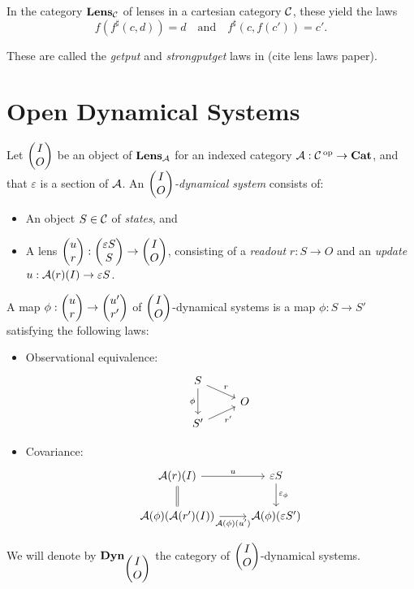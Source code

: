 In the category $\textbf{Lens}_{\operatorname{\mathcal{C}}}$ of lenses in a cartesian category $\operatorname{\mathcal{C}}$,
these yield the laws
$$f(f^{\sharp}(c, d)) = d \quad\text{and}\quad f^{\sharp}(c, f(c')) = c'.$$

These are called the \emph{getput} and \emph{strongputget} laws in (cite lens
laws paper).


\section{Open Dynamical Systems}

\begin{defn}
Let $\begin{pmatrix}{I} \\ {O} \end{pmatrix}$ be an object of $\textbf{Lens}_{\operatorname{\mathcal{A}}}$ for an indexed category
$\operatorname{\mathcal{A}} : \operatorname{\mathcal{C}}\operatorname{^\text{op}} \to \operatorname{\textbf{Cat}}$, and that $\varepsilon$ is a section of $\operatorname{\mathcal{A}}$. An
\emph{$\begin{pmatrix}{I} \\ {O} \end{pmatrix}$-dynamical system} consists of:
\begin{itemize}
\item An object $S \in \operatorname{\mathcal{C}}$ of \emph{states}, and
  \item A lens $\begin{pmatrix}{u} \\ {r} \end{pmatrix} : \begin{pmatrix}{\varepsilon S} \\ {S} \end{pmatrix} \to \begin{pmatrix}{I} \\ {O} \end{pmatrix}$,
    consisting of a \emph{readout} $r : S \to O$ and an \emph{update} $u :
    \operatorname{\mathcal{A}}(r)(I) \to \varepsilon S$.
  \end{itemize}

A map $\phi : \begin{pmatrix}{u} \\ {r} \end{pmatrix} \to \begin{pmatrix}{u'} \\ {r'} \end{pmatrix}$ of $\begin{pmatrix}{I} \\ {O} \end{pmatrix}$-dynamical systems
is a map $\phi : S \to S'$ satisfying the following laws:
\begin{itemize}
\item Observational equivalence:
  \[
    \begin{tikzcd}[row sep=tiny]
      S \arrow[dd, "\phi"']  \arrow[dr, "r"] & \\
      & O \\
      S' \arrow[ur, "r'"'] &
    \end{tikzcd}
  \]
\item Covariance:
  \[
    \begin{tikzcd}
      \Aa(r)(I) \arrow[r, "u"] \arrow[d, equal] & \varepsilon S \arrow[d, "\varepsilon_{\phi}"] \\
      \Aa(\phi)(\Aa(r')(I)) \arrow[r, "\Aa(\phi)(u')"'] & \Aa(\phi)(\varepsilon S')
    \end{tikzcd}
  \]
\end{itemize}
We will denote by $\textbf{Dyn}_{\begin{pmatrix}{I} \\ {O} \end{pmatrix}}$ the category of
$\begin{pmatrix}{I} \\ {O} \end{pmatrix}$-dynamical systems. 
\end{defn}

